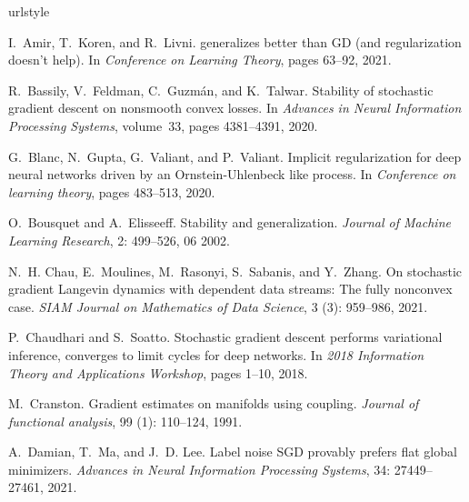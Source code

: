 \documentclass{article}
\begin{document}
\begin{thebibliography}{47}
\providecommand{\natexlab}[1]{#1}
\providecommand{\url}[1]{\texttt{#1}}
\expandafter\ifx\csname urlstyle\endcsname\relax
  \providecommand{\doi}[1]{doi: #1}\else
  \providecommand{\doi}{doi: \begingroup \urlstyle{rm}\Url}\fi

I.~Amir, T.~Koren, and R.~Livni.
 generalizes better than {GD} (and regularization doesn’t help).
\newblock In \emph{Conference on Learning Theory}, pages 63--92, 2021.

R.~Bassily, V.~Feldman, C.~Guzm\'{a}n, and K.~Talwar.
\newblock Stability of stochastic gradient descent on nonsmooth convex losses.
\newblock In \emph{Advances in Neural Information Processing Systems}, volume~33, pages 4381--4391, 2020.

G.~Blanc, N.~Gupta, G.~Valiant, and P.~Valiant.
\newblock Implicit regularization for deep neural networks driven by an {O}rnstein-{U}hlenbeck like process.
\newblock In \emph{Conference on learning theory}, pages 483--513, 2020.

O.~Bousquet and A.~Elisseeff.
\newblock Stability and generalization.
\newblock \emph{Journal of Machine Learning Research}, 2: 499--526, 06 2002.

N.~H. Chau, E.~Moulines, M.~Rasonyi, S.~Sabanis, and Y.~Zhang.
\newblock On stochastic gradient {L}angevin dynamics with dependent data streams: The fully nonconvex case.
\newblock \emph{SIAM Journal on Mathematics of Data Science}, 3 (3): 959--986, 2021.

P.~Chaudhari and S.~Soatto.
\newblock Stochastic gradient descent performs variational inference, converges to limit cycles for deep networks.
\newblock In \emph{2018 Information Theory and Applications Workshop}, pages 1--10, 2018.

M.~Cranston.
\newblock Gradient estimates on manifolds using coupling.
\newblock \emph{Journal of functional analysis}, 99 (1): 110--124, 1991.

A.~Damian, T.~Ma, and J.~D. Lee.
\newblock Label noise {SGD} provably prefers flat global minimizers.
\newblock \emph{Advances in Neural Information Processing Systems}, 34: 27449--27461, 2021.


\end{thebibliography}
\end{document}
